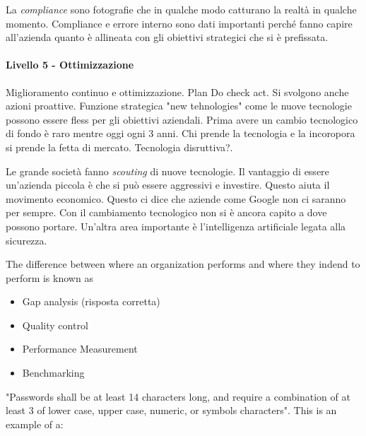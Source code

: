 

La \textit{compliance} sono fotografie che in qualche modo catturano la realtà 
in qualche momento. Compliance e errore interno sono dati importanti perché 
fanno capire all'azienda quanto è allineata con gli obiettivi strategici che si 
è prefissata.


\paragraph{Livello 5 - Ottimizzazione}

Miglioramento continuo e ottimizzazione. Plan Do check act.
Si svolgono anche azioni proattive. Funzione strategica "new tehnologies" come 
le nuove tecnologie possono essere fless per gli obiettivi aziendali. 
Prima avere un cambio tecnologico di fondo è raro mentre oggi ogni 3 anni. Chi 
prende la tecnologia e la incoropora si prende la fetta di mercato. Tecnologia 
disruttiva?.




Le grande società fanno \textit{scouting} di nuove tecnologie. Il vantaggio di 
essere un'azienda piccola è che si può essere aggressivi e investire. Questo 
aiuta il movimento economico. Questo ci dice che aziende come Google non ci 
saranno per sempre. Con il cambiamento tecnologico non si è ancora capito a dove 
possono portare. Un'altra area importante è l'intelligenza artificiale legata 
alla sicurezza.





The difference between where an organization performs and where they indend to 
perform is known as
\begin{itemize}
\item Gap analysis (risposta corretta)
\item Quality control
\item Performance Measurement
\item Benchmarking
\end{itemize}


"Passwords shall be at least 14 characters long, and require a combination of at 
least 3 of lower case, upper case, numeric, or symbols characters". This is an 
example of a:

